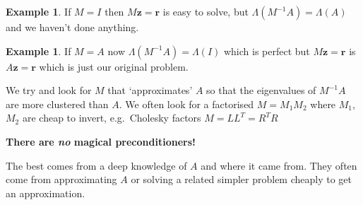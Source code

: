 \documentclass[12pt, a4paper]{article}
\renewcommand{\vec}[1]{\mathbf{#1}}
\theoremstyle{definition}
\newtheorem{example}[thm]{Example}
\theoremstyle{remark}
\numberwithin{equation}{section}
\begin{document}
\begin{example}
If $M=I$ then $M\vec{z}=\vec{r}$ is easy to solve, but $\Lambda(M^{-1}A) = \Lambda(A)$ and we haven't done anything.
\end{example}
\begin{example}
If $M=A$ now $\Lambda(M^{-1}A) = \Lambda(I)$ which is perfect but $M\vec{z}=\vec{r}$ is $A\vec{z}=\vec{r}$ which is just our original problem.
\end{example}

We try and look for $M$ that `approximates' $A$ so that the eigenvalues of $M^{-1}A$ are more clustered than $A$.
We often look for a factorised $M=M_1M_2$ where $M_1$, $M_2$ are cheap to invert, e.g.\ Cholesky factors $M = L L^T = R^T R$

{\bf There are \emph{no} magical preconditioners!}

The best comes from a deep knowledge of $A$ and where it came from.
They  often come from approximating $A$ or solving a related simpler problem cheaply to get an approximation.
\end{document}
